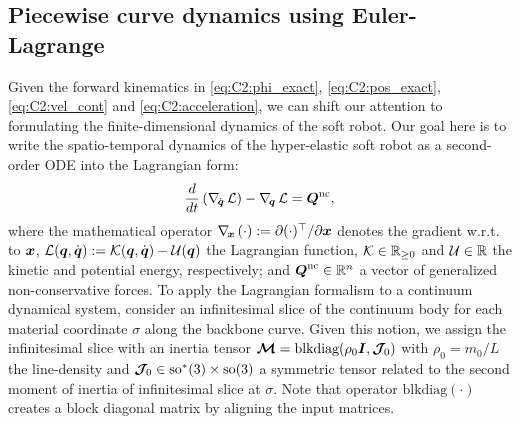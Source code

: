 \subsection{Piecewise curve dynamics using Euler-Lagrange}
\noindent Given the forward kinematics in \eqref{eq:C2:phi_exact}, \eqref{eq:C2:pos_exact}, \eqref{eq:C2:vel_cont} and \eqref{eq:C2:acceleration}, we can shift our attention to formulating the finite-dimensional dynamics of the soft robot. Our goal here is to write the spatio-temporal dynamics of the hyper-elastic soft robot as a second-order ODE into the Lagrangian form:
%
%
\begin{equation}
\frac{d}{d t}\left(\nabla_{\!{\dot{\boldsymbol{q}}}}\, \mathcal{L} \right) - \nabla_{\!{\boldsymbol{q}}}\, \mathcal{L} = \boldsymbol{Q}^{\textnormal{nc}}, \label{eq:C2:euler_largrange}
\end{equation}
%
\noindent where the mathematical operator $\nabla_{\!\boldsymbol{x}}\, (\cdot) := \partial(\cdot)^\top/\partial \boldsymbol{x}$ denotes the gradient w.r.t. to ${\boldsymbol{x}}$, $\mathcal{L}({\boldsymbol{q}},{\dot{\boldsymbol{q}}}) := \mathcal{K}({\boldsymbol{q}},{\dot{\boldsymbol{q}}}) - \mathcal{U}({\boldsymbol{q}})$ the Lagrangian function, $\mathcal{K} \in \mathbb{R}_{\ge0}$ and $\mathcal{U}\in \mathbb{R}$ the kinetic and potential energy, respectively; and $\boldsymbol{Q}^{\textnormal{nc}} \in \mathbb{R}^n$ a vector of generalized non-conservative forces. To apply the Lagrangian formalism to a continuum dynamical system,  consider an infinitesimal slice of the continuum body for each material coordinate $\sigma$ along the backbone curve. Given this notion, we assign the infinitesimal slice with an inertia tensor $\boldsymbol{\mathcal{M}} = \text{blkdiag}(\rho_0 \boldsymbol{I},\boldsymbol{\mathcal{J}}_{\!0})$ with $\rho_0 = m_0/L$ the line-density and $\boldsymbol{\mathcal{J}}_{\!0} \in \textup{\textrm{so}}^*(3) \times \textup{\textrm{so}}(3)$ a symmetric tensor related to the second moment of inertia of infinitesimal slice at $\sigma$.  Note that operator $\text{blkdiag}(\cdot)$ creates a block diagonal matrix by aligning the input matrices.

